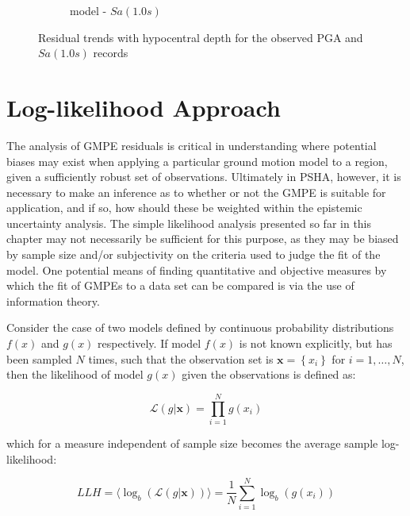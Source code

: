 \begin{figure}[htb]
\begin{subfigure}[b]{0.49\textwidth}
     \caption{\textcite{Akkar_etal2014} model - $Sa \left( {1.0 s} \right)$}
      \label{fig:sa1_depth_akkar2014}
  \end{subfigure}
  \caption{Residual trends with hypocentral depth for the observed PGA and $Sa \left( {1.0 s} \right)$ records}
  \label{fig:depth_resid}
\end{figure}

\section{Log-likelihood Approach \parencite{Scherbaum_etal2009}}
\label{sec:llh}

The analysis of GMPE residuals is critical in understanding where potential biases may exist when applying a particular ground motion model to a region, given a sufficiently robust set of observations. Ultimately in PSHA, however, it is necessary to make an inference as to whether or not the GMPE is suitable for application, and if so, how should these be weighted within the epistemic uncertainty analysis. The simple likelihood analysis presented so far in this chapter may not necessarily be sufficient for this purpose, as they may be biased by sample size and/or subjectivity on the criteria used to judge the fit of the model. One potential means of finding quantitative and objective measures by which the fit of GMPEs to a data set can be compared is via the use of information theory.

Consider the case of two models defined by continuous probability distributions $f \left( x \right)$ and $g \left( x \right)$ respectively. If model $f \left( x \right)$ is not known explicitly, but has been sampled $N$ times, such that the observation set is $\mathbf{x} = \left\{ {x_i} \right\}$ for $i = 1, \ldots, N$, then the likelihood of model $g \left( x \right)$ given the observations is defined as:

\begin{equation}
\mathcal{L}\left( {g | \mathbf{x}} \right) = \prod_{i=1}^{N} g \left( {x_i} \right)
\end{equation}

\noindent which for a measure independent of sample size becomes the average sample log-likelihood:

\begin{equation}
LLH = \langle \log_b \left( {\mathcal{L} \left( {g | \mathbf{x}} \right)} \right) \rangle = \frac{1}{N}\sum\limits_{i=1}^{N} \log_b \left( {g \left( {x_i} \right)} \right)
\end{equation}

